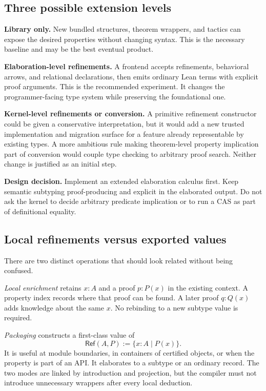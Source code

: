 \documentclass[11pt,a4paper]{article}
\newcommand{\Rfn}{\mathsf{Ref}}
\newcommand{\decision}[1]{\par\smallskip\textbf{Design decision.} #1\par\smallskip}
\theoremstyle{plain}
\theoremstyle{definition}
\theoremstyle{remark}
\begin{document}
\subsection{Three possible extension levels}
\textbf{Library only.} New bundled structures, theorem wrappers, and tactics
can expose the desired properties without changing syntax. This is the
necessary baseline and may be the best eventual product.

\textbf{Elaboration-level refinements.} A frontend accepts refinements,
behavioral arrows, and relational declarations, then emits ordinary Lean
terms with explicit proof arguments. This is the recommended experiment.
It changes the programmer-facing type system while preserving the
foundational one.

\textbf{Kernel-level refinements or conversion.} A primitive refinement
constructor could be given a conservative interpretation, but it would add a
new trusted implementation and migration surface for a feature already
representable by existing types. A more ambitious rule making theorem-level
property implication part of conversion would couple type checking to
arbitrary proof search. Neither change is justified as an initial step.

\decision{Implement an extended elaboration calculus first. Keep semantic
subtyping proof-producing and explicit in the elaborated output. Do not ask the
kernel to decide arbitrary predicate implication or to run a CAS as part of
definitional equality.}

\subsection{Local refinements versus exported values}
There are two distinct operations that should look related without being
confused.

\emph{Local enrichment} retains $x:A$ and a proof $p:P(x)$ in the existing
context. A property index records where that proof can be found. A later proof
$q:Q(x)$ adds knowledge about the same $x$. No rebinding to a new subtype value
is required.

\emph{Packaging} constructs a first-class value of
\[
 \Rfn(A,P):=\{x:A\mid P(x)\}.
\]
It is useful at module boundaries, in containers of certified objects, or when
the property is part of an API. It elaborates to a subtype or an ordinary
record. The two modes are linked by introduction and projection, but the
compiler must not introduce unnecessary wrappers after every local deduction.
\end{document}
